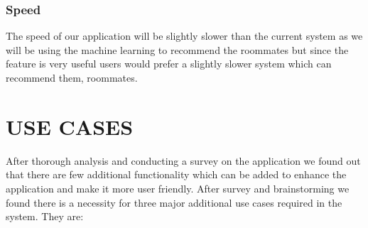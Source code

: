 \documentclass{sig-alternate-05-2015}
\begin{document}
\subsubsection{Speed}
The speed of our application will be slightly slower than the current system as we will be using the machine learning to recommend the roommates but since the feature is very useful users would prefer a slightly slower system which can recommend them, roommates.


\section{USE CASES}
After thorough analysis and conducting a survey on the application we found out that there are few additional functionality which can be added to enhance the application and make it more user friendly. After survey and brainstorming we found there is a necessity for three major additional use cases required in the system. They are:
\end{document}
